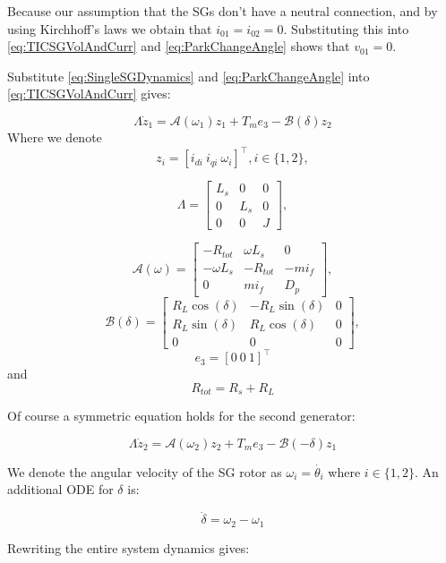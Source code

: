 \documentclass[letterpaper, 10 pt, conference]{ieeeconf}  %
\begin{document}
Because our assumption that the SGs don't have a neutral connection, and by using Kirchhoff's laws we obtain that $i_{01}=i_{02}=0$.  Substituting this into \eqref{eq:TICSGVolAndCurr} and \eqref{eq:ParkChangeAngle} shows that $v_{01} = 0$.

Substitute \eqref{eq:SingleSGDynamics} and \eqref{eq:ParkChangeAngle} into \eqref{eq:TICSGVolAndCurr}  gives:

\[
\varLambda\dot{z}_{1}=\mathcal{A}(\omega_{1})z_{1}+T_{m}e_{3}-\mathcal{B}(\delta)z_{2}
\]
Where we denote
 \[z_{i}=\left[i_{di}\ i_{qi}\  \omega_{i}\right]^\top,i\in\{1,2\},\]

\[
\varLambda=\left[\begin{array}{ccc}
L_{s} & 0 & 0\\
0 & L_{s} & 0\\
0 & 0 & J
\end{array}\right],
\]

\[
\mathcal{A}(\omega)=\left[\begin{array}{ccc}
-R_{tot} & \omega L_{s} & 0\\
-\omega L_{s} & -R_{tot} & -mi_{f}\\
0 & mi_{f} & D_{p}
\end{array}\right],
\]
\[\mathcal{B}(\delta)=\left[\begin{array}{ccc}
R_{L}\cos(\delta) & -R_{L}\sin(\delta) & 0\\
R_{L}\sin(\delta) & R_{L}\cos(\delta) & 0\\
0 & 0 & 0
\end{array}\right],
\]
\[e_{3}=\left[0\ 0\ 1\right]^\top\] and
\[ R_{tot}=R_{s}+R_{L} \]

Of course a symmetric equation holds for the second generator:

\[
\varLambda\dot{z}_{2}=\mathcal{A}(\omega_{2})z_{2}+T_{m}e_{3}-\mathcal{B}(-\delta)z_{1}
\]

We denote the angular velocity  of the SG rotor as $\omega_i = \dot{\theta_i}$ where $i \in \{1,2\}$. 
An additional ODE for $\delta$ is:

\[
\dot{\delta}=\omega_{2}-\omega_{1}
\]

Rewriting the entire system dynamics gives:
\end{document}
